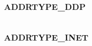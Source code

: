 \documentclass[letterpaper,10pt,english]{sphinxmanual}
\begin{document}
\begin{fulllineitems}
\label{appdev/refs/macros/ADDRTYPE_CHAOS:ADDRTYPE_CHAOS}
\end{fulllineitems}


\begin{tabulary}{\linewidth}{|L|L|}
\hline

 & 
\\
\hline\end{tabulary}



\subsubsection{ADDRTYPE\_DDP}
\label{appdev/refs/macros/ADDRTYPE_DDP:addrtype-ddp-data}\label{appdev/refs/macros/ADDRTYPE_DDP::doc}\label{appdev/refs/macros/ADDRTYPE_DDP:addrtype-ddp}

\begin{fulllineitems}
\label{appdev/refs/macros/ADDRTYPE_DDP:ADDRTYPE_DDP}
\end{fulllineitems}


\begin{tabulary}{\linewidth}{|L|L|}
\hline

 & 
\\
\hline\end{tabulary}



\subsubsection{ADDRTYPE\_INET}
\label{appdev/refs/macros/ADDRTYPE_INET:addrtype-inet}\label{appdev/refs/macros/ADDRTYPE_INET:addrtype-inet-data}\label{appdev/refs/macros/ADDRTYPE_INET::doc}

\begin{fulllineitems}
\label{appdev/refs/macros/ADDRTYPE_INET:ADDRTYPE_INET}
\end{fulllineitems}


\begin{tabulary}{\linewidth}{|L|L|}
\hline

 & 
\\
\hline\end{tabulary}
\end{document}
